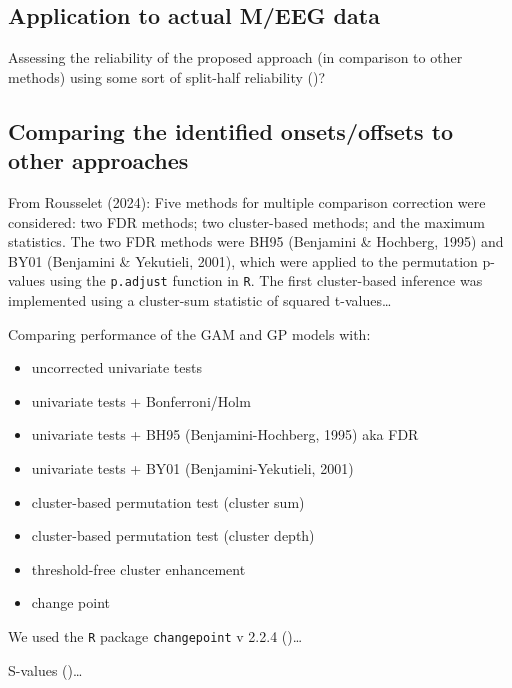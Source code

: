 \documentclass[
  doc,
  floatsintext,
  longtable,
  a4paper,
  nolmodern,
  notxfonts,
  notimes,
  colorlinks=true,linkcolor=blue,citecolor=blue,urlcolor=blue]{apa7}
\providecommand{\tightlist}{%
  \setlength{\itemsep}{0pt}\setlength{\parskip}{0pt}}
\begin{document}
\subsection{Application to actual M/EEG
data}\label{application-to-actual-meeg-data}

Assessing the reliability of the proposed approach (in comparison to
other methods) using some sort of split-half reliability
()?

\subsection{Comparing the identified onsets/offsets to other
approaches}\label{comparing-the-identified-onsetsoffsets-to-other-approaches}

From Rousselet (2024): Five methods for multiple comparison correction
were considered: two FDR methods; two cluster-based methods; and the
maximum statistics. The two FDR methods were BH95 (Benjamini \&
Hochberg, 1995) and BY01 (Benjamini \& Yekutieli, 2001), which were
applied to the permutation p-values using the \texttt{p.adjust} function
in \texttt{R}. The first cluster-based inference was implemented using a
cluster-sum statistic of squared t-values\ldots{}

Comparing performance of the GAM and GP models with:

\begin{itemize}
\tightlist
\item
  uncorrected univariate tests
\item
  univariate tests + Bonferroni/Holm
\item
  univariate tests + BH95 (Benjamini-Hochberg, 1995) aka FDR
\item
  univariate tests + BY01 (Benjamini-Yekutieli, 2001)
\item
  cluster-based permutation test (cluster sum)
\item
  cluster-based permutation test (cluster depth)
\item
  threshold-free cluster enhancement
\item
  change point
\end{itemize}

We used the \texttt{R} package \texttt{changepoint} v 2.2.4
()\ldots{}

S-values ()\ldots{}
\end{document}
